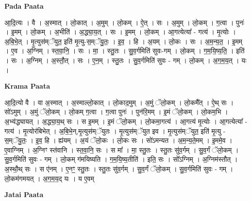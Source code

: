 \documentclass[17pt]{extarticle}
\begin{document}
\textbf{Pada Paata} \newline

आ॒दि॒त्यः । वै । अ॒स्मात् । लो॒कात् । अ॒मुम् । लो॒कम् । ऐ॒त् । सः । अ॒मुम् । लो॒कम् । ग॒त्वा । पुनः॑ । इ॒मम् । लो॒कम् । अ॒भीति॑ । अ॒द्ध्या॒य॒त् । सः । इ॒मम् । लो॒कम् । आ॒गत्येत्या᳚ - गत्य॑ । मृ॒त्योः । अ॒बि॒भे॒त् । मृ॒त्युस॑म्ॅयुत॒ इति॑ मृ॒त्यु-स॒म्ॅयु॒तः॒ । इ॒व॒ । हि । अ॒यम् । लो॒कः । सः । अ॒म॒न्य॒त॒ । इ॒मम् । ए॒व । अ॒ग्निम् । स्त॒वा॒नि॒ । सः । मा॒ । स्तु॒तः । सु॒व॒र्गमिति॑ सुवः-गम् । लो॒कम् । ग॒म॒यि॒ष्य॒ति॒ । इति॑ । सः । अ॒ग्निम् । अ॒स्तौ॒त् । सः । ए॒न॒म् । स्तु॒तः । सु॒व॒र्गमिति॑ सुवः - गम् । लो॒कम् । अ॒ग॒म॒य॒त् । यः ।  \newline


\textbf{Krama Paata} \newline

आ॒दि॒त्यो वै । वा अ॒स्मात् । अ॒स्माल्लो॒कात् । लो॒काद॒मुम् । अ॒मुं ॅलो॒कम् । लो॒कमै᳚त् । ऐ॒थ् सः । सो॑ऽमुम् । अ॒मुं ॅलो॒कम् । लो॒कम् ग॒त्वा । ग॒त्वा पुनः॑ । पुन॑रि॒मम् । इ॒मं ॅलो॒कम् । लो॒कम॒भि । अ॒भ्य॑द्ध्यायत् । अ॒द्ध्या॒य॒थ् सः । स इ॒मम् । इ॒मं ॅलो॒कम् । लो॒कमा॒गत्य॑ । आ॒गत्य॑ मृ॒त्योः । आ॒गत्येत्या᳚ - गत्य॑ । मृ॒त्योर॑बिभेत् । अ॒बि॒भे॒न्,मृ॒त्युस॑म्ॅयुतः । मृ॒त्युस॑म्ॅयुत इव । मृ॒त्युस॑म्ॅयुत॒ इति॑ मृ॒त्यु - स॒म्ॅयु॒तः॒ । इ॒व॒ हि । ह्य॑यम् । अ॒यं ॅलो॒कः । लो॒कः सः । सो॑ऽमन्यत । अ॒म॒न्य॒ते॒मम् । इ॒ममे॒व । ए॒वाग्निम् । अ॒ग्निꣳ स्त॑वानि । स्त॒वा॒नि॒ सः । स मा᳚ । मा॒ स्तु॒तः । स्तु॒तः सु॑व॒र्गम् । सु॒व॒र्गं ॅलो॒कम् । सु॒व॒र्गमिति॑ सुवः - गम् । लो॒कम् ग॑मयिष्यति । ग॒म॒यि॒ष्य॒तीति॑ । इति॒ सः । सो᳚ऽग्निम् । अ॒ग्निम॑स्तौत् । अ॒स्थौ॒थ् सः । स ए॑नम् । ए॒नꣳ॒॒ स्तु॒तः । स्तु॒तः सु॑व॒र्गम् । सु॒व॒र्गं ॅलो॒कम् । सु॒व॒र्गमिति॑ सुवः - गम् । लो॒कम॑गमयत् । अ॒ग॒म॒य॒द् यः । य ए॒वम् \newline

\textbf{Jatai Paata} \newline
\end{document}
